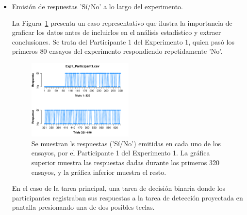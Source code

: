 \begin{itemize}
\item Emisión de respuestas 'Sí/No' a lo largo del experimento.



La Figura~\ref{fig:Resp_E1_P1} presenta un caso representativo que ilustra la importancia de graficar los datos antes de incluirlos en el análisis estadístico y extraer conclusiones. Se trata del Participante 1 del Experimento 1, quien pasó los primeros 80 ensayos del experimento respondiendo repetidamente 'No'. 


\begin{figure}[th]
\centering
\includegraphics[width=0.50\textwidth]{Figures/Response_Exp1_P1} 
\caption[Respuesta emitida por ensayo; ejemplo de participante sesgado]{Se muestran ls respuestas ('Sí/No') emitidas en cada uno de los ensayos, por el Participante 1 del Experimento 1. La gráfica superior muestra las respuestas dadas durante los primeros 320 ensayos, y la gráfica inferior muestra el resto.}
\label{fig:Resp_E1_P1}
\end{figure}


En el caso de la tarea principal, una tarea de decisión  binaria donde los participantes registraban sus respuestas a la tarea de detección proyectada en pantalla presionando una de dos posibles teclas. 




\end{itemize}
